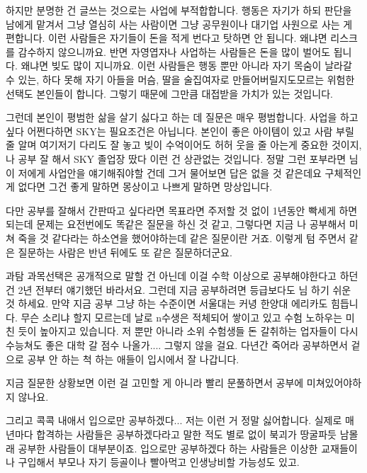 하지만 분명한 건 글쓰는 것으로는 사업에 부적합합니다.
행동은 자기가 하되 판단을 남에게 맡겨서 그냥 열심히 사는 사람이면 그냥 공무원이나 대기업 사원으로 사는 게 편합니다.
이런 사람들은 자기들이 돈을 적게 번다고 탓하면 안 됩니다. 왜냐면 리스크를 감수하지 않으니까요.
반면 자영엽자나 사업하는 사람들은 돈을 많이 벌어도 됩니다. 왜냐면 빚도 많이 지니까요.
이런 사람들은 행동 뿐만 아니라 자기 목숨이 날라갈 수 있는, 하다 못해 자기 아들을 머슴, 딸을 술집여자로 만들어버릴지도모르는
위험한 선택도 본인들이 합니다. 그렇기 때문에 그만큼 대접받을 가치가 있는 것입니다.
\vspace{5mm}

그런데 본인이 평범한 삶을 살기 싫다고 하는 데 질문은 매우 평범합니다.
사업을 하고 싶다 어쩐다하면 SKY는 필요조건은 아닙니다. 본인이 좋은 아이템이 있고 사람 부릴 줄 알며 여기저기 다리도 잘 놓고
빚이 수억이어도 허허 웃을 줄 아는게 중요한 것이지, 나 공부 잘 해서 SKY 졸업장 땄다 이런 건 상관없는 것입니다.
정말 그런 포부라면 님이 저에게 사업안을 얘기해줘야할 건데 그거 물어보면 답은 없을 것 같은데요
구체적인 게 없다면 그건 좋게 말하면 몽상이고 나쁘게 말하면 망상입니다.
\vspace{5mm}

다만 공부를 잘해서 간판따고 싶다라면 목표라면 주저할 것 없이 1년동안 빡세게 하면 되는데
문제는 요전번에도 똑같은 질문을 하신 것 같고, 그렇다면 지금 나 공부해서 미쳐 죽을 것 같다라는 하소연을 했어야하는데 같은 질문이란 거죠.
이렇게 텀 주면서 같은 질문하는 사람은 반년 뒤에도 또 같은 질문하더군요.
\vspace{5mm}

과탐 과목선택은 공개적으로 말할 건 아닌데 이걸 수학 이상으로 공부해야한다고 하던 건 2년 전부터 얘기했던 바라서요.
그런데 지금 공부하려면 등급보다도 님 하기 쉬운 것 하세요. 만약 지금 공부 그냥 하는 수준이면 서울대는 커녕 한양대 에리카도 힘듭니다.
무슨 소리냐 할지 모르는데 날로 n수생은 적체되어 쌓이고 있고 수험 노하우는 미친 듯이 높아지고 있습니다.
저 뿐만 아니라 소위 수험생들 돈 갈취하는 업자들이 다시 수능쳐도 좋은 대학 갈 점수 나올가.... 그렇지 않을 걸요.
다년간 죽어라 공부하면서 겉으로 공부 안 하는 척 하는 애들이 입시에서 잘 나갑니다.
\vspace{5mm}

지금 질문한 상황보면 이런 걸 고민할 게 아니라 빨리 문풀하면서 공부에 미쳐있어야하지 않나요.
\vspace{5mm}

그리고 콕콕 내애서 입으로만 공부하겠다... 저는 이런 거 정말 싫어합니다.
실제로 매년마다 합격하는 사람들은 공부하겠다라고 말한 적도 별로 없이 북괴가 땅굴파듯 남몰래 공부한 사람들이 대부분이죠.
입으로만 공부하겠다 하는 사람들은 이상한 교재들이나 구입해서 부모나 자기 등골이나 빨아먹고 인생낭비할 가능성도 있고.
\vspace{5mm}

